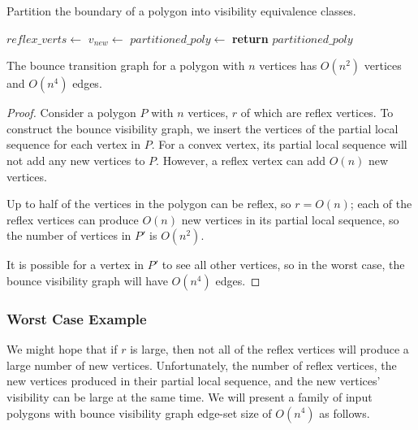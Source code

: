 \documentclass[]{styles/svproc}  %
\begin{document}
\begin{algorithm}
\caption{Partition the boundary of a polygon into visibility
equivalence classes.}
\label{algo:insert}
\begin{algorithmic}
\State $reflex\_verts \gets$ 
     
        \State $v_{new} \gets$ 
    \EndFor
\EndFor
\State $partitioned\_poly \gets$ 
\State \textbf{return} $partitioned\_poly$
\EndProcedure
\end{algorithmic}
\end{algorithm}

\begin{proposition} The bounce transition graph for a polygon with $n$ vertices has 
$O(n^2)$ vertices and $O(n^4)$ edges.
\end{proposition}

\begin{proof}

Consider a polygon $P$ with $n$ vertices, $r$ of which are reflex vertices. To
construct the bounce visibility graph, we insert the vertices of the partial
local sequence for each vertex in $P$. For a convex vertex, its partial local sequence 
will not add any new vertices to $P$. However, a reflex vertex can add $O(n)$ new vertices. 

Up to half of the vertices in the polygon can be reflex, so $r = O(n)$; each 
of the reflex vertices can produce $O(n)$ new vertices in its partial local 
sequence, so the number of vertices in $P'$ is $O(n^2)$. 

It is possible for a vertex in $P'$ to see all other vertices, so in the worst
case, the bounce visibility graph will have $O(n^4)$ edges.

\end{proof}

\subsubsection{Worst Case Example}

We might hope that if $r$ is large, then not all of the reflex vertices will
produce a large number of new vertices. Unfortunately, the number of reflex
vertices, the new vertices produced in their partial local sequence, and the new
vertices' visibility can be large at the same time. We will present a family of
input polygons with bounce visibility graph edge-set size of $O(n^4)$ as
follows.
\end{document}
